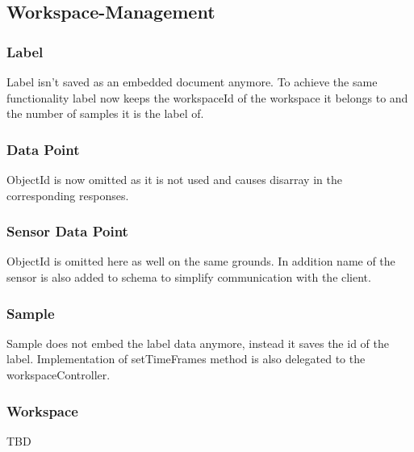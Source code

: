 \subsection{Workspace-Management}
\subsubsection{Label}
Label isn't saved as an embedded document anymore. To achieve the same functionality label now keeps the workspaceId of the workspace it belongs to and the number of samples it is the label of.
\subsubsection{Data Point}
ObjectId is now omitted as it is not used and causes disarray in the corresponding responses.
\subsubsection{Sensor Data Point}
ObjectId is omitted here as well on the same grounds. In addition name of the sensor is also added to schema to simplify communication with the client.
\subsubsection{Sample}
Sample does not embed the label data anymore, instead it saves the id of the label. Implementation of setTimeFrames method is also delegated to the workspaceController.
\subsubsection{Workspace}
TBD